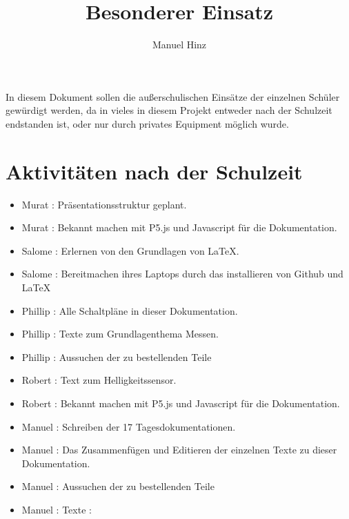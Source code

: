 \documentclass{article}
\author{Manuel Hinz}
\title{Besonderer Einsatz}
\begin{document}
\maketitle

In diesem Dokument sollen die außerschulischen Einsätze der einzelnen Schüler gewürdigt werden, da in vieles in diesem Projekt entweder nach der Schulzeit endstanden ist, oder nur durch privates Equipment möglich wurde.


\section{Aktivitäten nach der Schulzeit}

\begin{itemize}

\item Murat : Präsentationsstruktur geplant.

\item Murat : Bekannt machen mit P5.js und Javascript für die Dokumentation.

\item Salome : Erlernen von den Grundlagen von \LaTeX .

\item Salome : Bereitmachen ihres Laptops durch das installieren  von Github und \LaTeX

\item Phillip : Alle Schaltpläne in dieser Dokumentation.

\item Phillip : Texte zum Grundlagenthema Messen.

\item Phillip : Aussuchen der zu bestellenden Teile

\item Robert : Text zum Helligkeitssensor.

\item Robert : Bekannt machen mit P5.js und Javascript für die Dokumentation.


\item Manuel : Schreiben der 17 Tagesdokumentationen.

\item Manuel : Das Zusammenfügen und Editieren der einzelnen Texte zu dieser Dokumentation.

\item Manuel : Aussuchen der zu bestellenden Teile

\item Manuel : Texte :    

\end{itemize}
\end{document}
